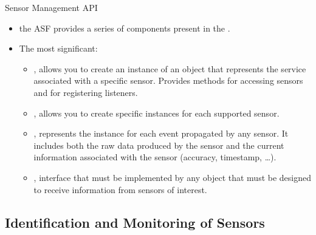 \documentclass{beamer}
\begin{document}
  \begin{frame}{Sensor Management API}
    \begin{itemize}\itemsep10pt
      \item the ASF provides a series of components present in the
      .
      \item The most significant:
      \begin{itemize}
        \item {}, allows you to create an instance of an
        object that represents the service associated with a specific sensor.
        Provides methods for accessing sensors and for registering listeners.
        \item {}, allows you to create specific instances for each
        supported sensor.
        \item {}, represents the instance for each event
        propagated by any sensor. It includes both the raw data produced by the
        sensor and the current information associated with the sensor (accuracy,
        timestamp, \dots).
        \item {}, interface that must be implemented by
        any object that must be designed to receive information from sensors of
        interest. 
      \end{itemize}
  \end{itemize}

  \end{frame}

\subsection{Identification and Monitoring of Sensors}
\end{document}
